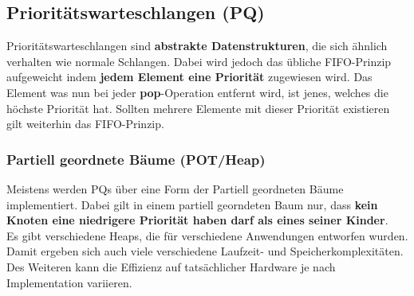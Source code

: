 \documentclass{article}
\begin{document}
\subsection{Prioritätswarteschlangen (PQ)}
Prioritätswarteschlangen sind \textbf{abstrakte Datenstrukturen}, die sich ähnlich verhalten wie normale Schlangen. Dabei wird jedoch das übliche FIFO-Prinzip aufgeweicht indem \textbf{jedem Element eine Priorität} zugewiesen wird. Das Element was nun bei jeder \textbf{pop}-Operation entfernt wird, ist jenes, welches die höchste Priorität hat. Sollten mehrere Elemente mit dieser Priorität existieren gilt weiterhin das FIFO-Prinzip.
\subsubsection{Partiell geordnete Bäume (POT/Heap)}
Meistens werden PQs über eine Form der Partiell geordneten Bäume implementiert. Dabei gilt in einem partiell georndeten Baum nur, dass \textbf{kein Knoten eine niedrigere Priorität haben darf als eines seiner Kinder}.\\
Es gibt verschiedene Heaps, die für verschiedene Anwendungen entworfen wurden. Damit ergeben sich auch viele verschiedene Laufzeit- und Speicherkomplexitäten. Des Weiteren kann die Effizienz auf tatsächlicher Hardware je nach Implementation variieren.
\end{document}
